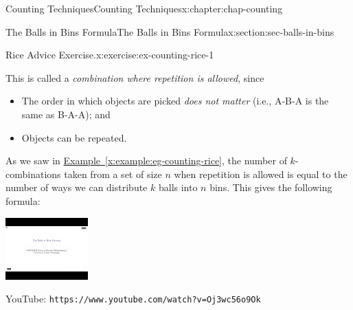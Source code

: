 \documentclass[oneside,10pt,]{book}
\newcommand{\xreffont}{\relax}
\newcommand{\mono}[1]{\texttt{#1}}
\numberwithin{equation}{section}
\newlength{\qrsize}
\newlength{\previewwidth}
\begin{document}
\begin{chapterptx}{Counting Techniques}{}{Counting Techniques}{}{}{x:chapter:chap-counting}
\begin{sectionptx}{The Balls in Bins Formula}{}{The Balls in Bins Formula}{}{}{x:section:sec-balls-in-bins}
\begin{inlineexercise}{Rice Advice Exercise.}{x:exercise:ex-counting-rice-1}
\end{inlineexercise}%
This is called a \emph{combination where repetition is allowed}, since%
\begin{itemize}[label=\textbullet]
\item{}The order in which objects are picked \emph{does not matter} (i.e.\@, A-B-A is the same as B-A-A); and%
\item{}Objects can be repeated.%
\end{itemize}
As we saw in \hyperref[x:example:eg-counting-rice]{Example~{\xreffont\ref{x:example:eg-counting-rice}}}, the number of \(k\)-combinations taken from a set of size \(n\) when repetition is allowed is equal to the number of ways we can distribute \(k\) balls into \(n\) bins. This gives the following formula:%
\begin{sidebyside}{1}{0}{0}{0}%
\begin{sbspanel}{1}%
\setlength{\qrsize}{9em}
\setlength{\previewwidth}{\linewidth}
\addtolength{\previewwidth}{-\qrsize}
\begin{tcbraster}[raster columns=2, raster column skip=1pt, raster halign=center, raster force size=false, raster left skip=0pt, raster right skip=0pt]%
\begin{tcolorbox}[previewstyle, width=\previewwidth]%
\includegraphics[width=0.80\linewidth,height=\qrsize,keepaspectratio]{images/video-balls-in-bins.jpg}%
\end{tcolorbox}%
\begin{tcolorbox}[qrstyle]%
{\hypersetup{urlcolor=black}}%
\end{tcolorbox}%
\begin{tcolorbox}[captionstyle]%
\small YouTube: \mono{https://www.youtube.com/watch?v=Oj3wc56o9Ok}\end{tcolorbox}%

\end{tcbraster}
\end{sbspanel}
\end{sidebyside}
\end{sectionptx}
\end{chapterptx}
\end{document}
